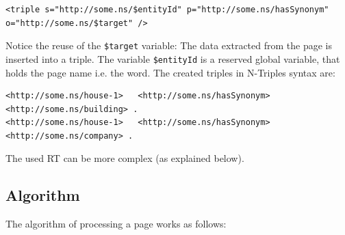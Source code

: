 \begin{lstlisting}[style=XML]
<triple s="http://some.ns/$entityId" p="http://some.ns/hasSynonym" o="http://some.ns/$target" />
\end{lstlisting}
Notice the reuse of the \texttt{\$target} variable:
The data extracted from the page is inserted into a triple.
The variable \texttt{\$entityId} is a reserved global variable, that holds the page name i.e. the word.
The created triples in N-Triples syntax are:
\begin{lstlisting}[style=N3]
<http://some.ns/house-1>   <http://some.ns/hasSynonym>   <http://some.ns/building> .
<http://some.ns/house-1>   <http://some.ns/hasSynonym>   <http://some.ns/company> .
\end{lstlisting}
The used RT can be more complex (as explained below).

\subsection{Algorithm}
The algorithm of processing a page works as follows:

